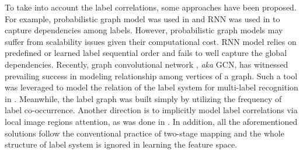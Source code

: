 \documentclass[letterpaper]{article} \usepackage{aaai20}  \usepackage{times}  \usepackage{helvet} \usepackage{courier}  \usepackage[hyphens]{url}  \usepackage{graphicx} \usepackage{subfigure}
\begin{document}
To take into account the label correlations, some approaches have been proposed. For example, probabilistic graph model was used in \cite{li2016conditional,li2014multi} and RNN was used in \cite{wang2016cnn} to capture dependencies among labels. However, probabilistic graph models may suffer from scalability issues given their computational cost. RNN model relies on predefined or learned label sequential order and fails to well capture the global dependencies. Recently, graph convolutional network \cite{kipf2016semi}, \emph{aka} GCN, has witnessed prevailing success in modeling relationship among vertices of a graph. Such a tool was leveraged to model the relation of the label system for multi-label recognition in \cite{chen2019multi}. Meanwhile, the label graph was built simply by utilizing the frequency of label co-occurrence. Another direction is to implicitly model label correlations via local image regions attention, as was done in \cite{wang2017multi,zhu2017learning}. In addition, all the aforementioned solutions follow the conventional practice of two-stage mapping and the whole structure of label system is ignored in learning the feature space.
	
\end{document}
